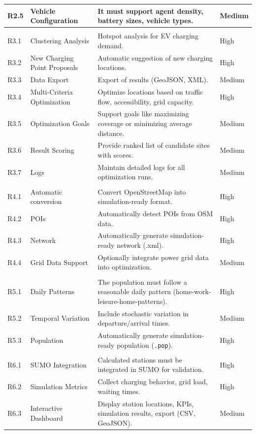 \begin{longtable}{|P{1.5cm}|P{4cm}|P{8cm}|P{2cm}|}
\hline
R2.5 & Vehicle Configuration & It must support agent density, battery sizes, vehicle types. & Medium \\
\hline
{}
 \\
\hline
R3.1 & Clustering Analysis & Hotspot analysis for EV charging demand. & High \\
\hline
R3.2 & New Charging Point Proposals & Automatic suggestion of new charging locations. & High \\
\hline
R3.3 & Data Export & Export of results (GeoJSON, XML). & Medium \\
\hline
R3.4 & Multi-Criteria Optimization & Optimize locations based on traffic flow, accessibility, grid capacity. & High \\
\hline
R3.5 & Optimization Goals & Support goals like maximizing coverage or minimizing average distance. & Medium \\
\hline
R3.6 & Result Scoring & Provide ranked list of candidate sites with scores. & Medium \\
\hline
R3.7 & Logs & Maintain detailed logs for all optimization runs. & Medium \\
\hline
{}
 \\
\hline
R4.1 & Automatic conversion & Convert OpenStreetMap into simulation-ready format. & High \\
\hline
R4.2 & POIs & Automatically detect POIs from OSM data. & High \\
\hline
R4.3 & Network & Automatically generate simulation-ready network (.xml). & High \\
\hline
R4.4 & Grid Data Support & Optionally integrate power grid data into optimization. & Medium \\
\hline
{}
 \\
\hline
R5.1 & Daily Patterns & The population must follow a reasonable daily pattern (home-work-leisure-home-patterns). & High \\
\hline
R5.2 & Temporal Variation & Include stochastic variation in departure/arrival times. & Medium \\
\hline
R5.3 & Population & Automatically generate simulation-ready population (\texttt{.pop}). & High \\
\hline
{}
 \\
\hline
R6.1 & SUMO Integration & Calculated stations must be integrated in SUMO for validation. & High \\
\hline
R6.2 & Simulation Metrics & Collect charging behavior, grid load, waiting times. & High \\
\hline
R6.3 & Interactive Dashboard & Display station locations, KPIs, simulation results, export (CSV, GeoJSON). & Medium \\
\hline
\end{longtable}

